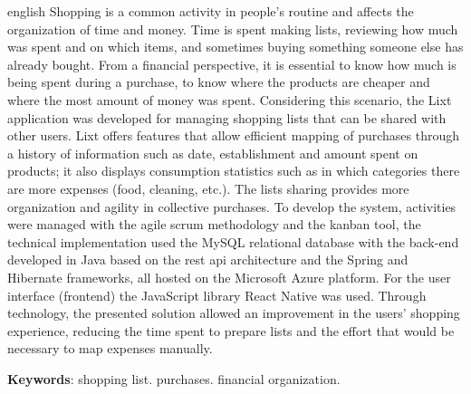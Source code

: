 \begin{resumo}[Abstract]
 \begin{otherlanguage*}{english}
Shopping is a common activity in people's routine and affects the organization of time and money. Time is spent making lists, reviewing how much was spent and on which items, and sometimes buying something someone else has already bought. From a financial perspective, it is essential to know how much is being spent during a purchase, to know where the products are cheaper and where the most amount of money was spent. Considering this scenario, the Lixt application was developed for managing shopping lists that can be shared with other users. Lixt offers features that allow efficient mapping of purchases through a history of information such as date, establishment and amount spent on products; it also displays consumption statistics such as in which categories there are more expenses (food, cleaning, etc.). The lists sharing provides more organization and agility in collective purchases. To develop the system, activities were managed with the agile scrum methodology and the kanban tool, the technical implementation used the MySQL relational database with the back-end developed in Java based on the \gls{rest} \gls{api} architecture and the Spring and Hibernate frameworks, all hosted on the Microsoft Azure platform. For the user interface (\gls{frontend}) the JavaScript library React Native was used. Through technology, the presented solution allowed an improvement in the users' shopping experience, reducing the time spent to prepare lists and the effort that would be necessary to map expenses manually.
 
   \vspace{\onelineskip}

   \noindent 
   \textbf{Keywords}: shopping list. purchases. financial organization.
 \end{otherlanguage*}
\end{resumo}